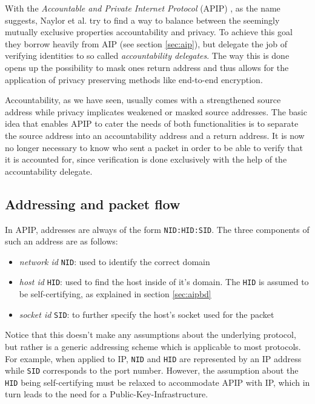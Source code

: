 \documentclass{acm_proc_article-sp}
\begin{document}
With the \emph{Accountable and Private Internet Protocol} (APIP) \cite{apip}, as the name suggests, Naylor et al. try to find a way to balance between the seemingly mutually exclusive properties accountability and privacy. To achieve this goal they borrow heavily from AIP (see section \ref{sec:aip}), but delegate the job of verifying identities to so called \emph{accountability delegates}. The way this is done opens up the possibility to mask ones return address and thus allows for the application of privacy preserving methods like end-to-end encryption.

Accountability, as we have seen, usually comes with a strengthened source address while privacy implicates weakened or masked source addresses. The basic idea that enables APIP to cater the needs of both functionalities is to separate the source address into an accountability address and a return address. It is now no longer necessary to know who sent a packet in order to be able to verify that it is accounted for, since verification is done exclusively with the help of the accountability delegate.

\subsection{Addressing and packet flow}

In APIP, addresses are always of the form \texttt{NID:HID:SID}. The three components of such an address are as follows:
\begin{itemize}
\item \emph{network id} \texttt{NID}: used to identify the correct domain
\item \emph{host id} \texttt{HID}: used to find the host inside of it's domain. The \texttt{HID} is assumed to be self-certifying, as explained in section \ref{sec:aipbd}
\item \emph{socket id} \texttt{SID}: to further specify the host's socket used for the packet
\end{itemize}
Notice that this doesn't make any assumptions about the underlying protocol, but rather is a generic addressing scheme which is applicable to most protocols. For example, when applied to IP, \texttt{NID} and \texttt{HID} are represented by an IP address while \texttt{SID} corresponds to the port number. However, the assumption about the \texttt{HID} being self-certifying must be relaxed to accommodate APIP with IP, which in turn leads to the need for a Public-Key-Infrastructure. 
\end{document}
